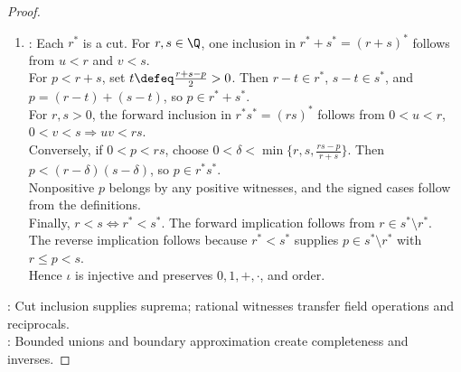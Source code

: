 \begin{theorem}
\begin{proof}
\begin{enumerate}[label=(\roman*)]
\begin{enumerate}[label=(\alph*)]
Every $c\leq0$ belongs to the product by any positive pair of witnesses. Therefore $\alpha\alpha^{-1}=1^*$.
\item {}: Addition by a fixed cut preserves inclusion.\\
If $\beta<\gamma$, then $\alpha+\beta\subseteq\alpha+\gamma$; equality would imply $\beta=\gamma$ by adding $-\alpha$. Hence $\alpha+\beta<\alpha+\gamma$ and $\alpha>0^*\Longleftrightarrow-\alpha<0^*$.\\
Every nonzero cut has the form $\varepsilon a$ with $a>0^*$ and $\varepsilon\in\{1,-1\}$.\\
The signed definition makes products commutative and associative and sets $(-a)^{-1}=-a^{-1}$.\\
For distributivity, $a(b-c)=ab-ac$ when $a,b,c>0^*$.\\
If $b>c$, then $a(b-c)+ac=ab$ by positive distributivity and additive cancellation.\\
The cases $b=c$ and $b<c$ follow by zero and sign reversal, so this identity covers all sign patterns.\\
Since $0^*\neq1^*$, all field axioms hold. Strict addition compatibility and $\alpha,\beta>0^*\Rightarrow\alpha\beta>0^*$ make the field ordered.
\end{enumerate}
\item {}: Each $r^*$ is a cut. For $r,s\in\Q$, one inclusion in $r^*+s^*=(r+s)^*$ follows from $u<r$ and $v<s$.\\
For $p<r+s$, set $t\defeq\frac{r+s-p}{2}>0$. Then $r-t\in r^*$, $s-t\in s^*$, and $p=(r-t)+(s-t)$, so $p\in r^*+s^*$.\\
For $r,s>0$, the forward inclusion in $r^*s^*=(rs)^*$ follows from $0<u<r$, $0<v<s\Rightarrow uv<rs$.\\
Conversely, if $0<p<rs$, choose $0<\delta<\min\{r,s,\frac{rs-p}{r+s}\}$. Then $p<(r-\delta)(s-\delta)$, so $p\in r^*s^*$.\\
Nonpositive $p$ belongs by any positive witnesses, and the signed cases follow from the definitions.\\
Finally, $r<s\Longleftrightarrow r^*<s^*$. The forward implication follows from $r\in s^*\setminus r^*$.\\
The reverse implication follows because $r^*<s^*$ supplies $p\in s^*\setminus r^*$ with $r\leq p<s$.\\
Hence $\iota$ is injective and preserves $0,1,+,\cdot$, and order.
\end{enumerate}
: Cut inclusion supplies suprema; rational witnesses transfer field operations and reciprocals.\\
: Bounded unions and boundary approximation create completeness and inverses.
\end{proof}
\end{theorem}

